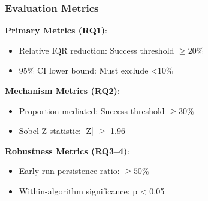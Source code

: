 \subsubsection{Evaluation Metrics}

\textbf{Primary Metrics (RQ1)}:
\begin{itemize}
\item Relative IQR reduction: Success threshold $\geq 20$\%
\item 95\% CI lower bound: Must exclude <10\%
\end{itemize}

\textbf{Mechanism Metrics (RQ2)}:
\begin{itemize}
\item Proportion mediated: Success threshold $\geq 30$\%
\item Sobel Z-statistic: |Z| $\geq$ 1.96
\end{itemize}

\textbf{Robustness Metrics (RQ3--4)}:
\begin{itemize}
\item Early-run persistence ratio: $\geq 50$\%
\item Within-algorithm significance: p < 0.05
\end{itemize}

